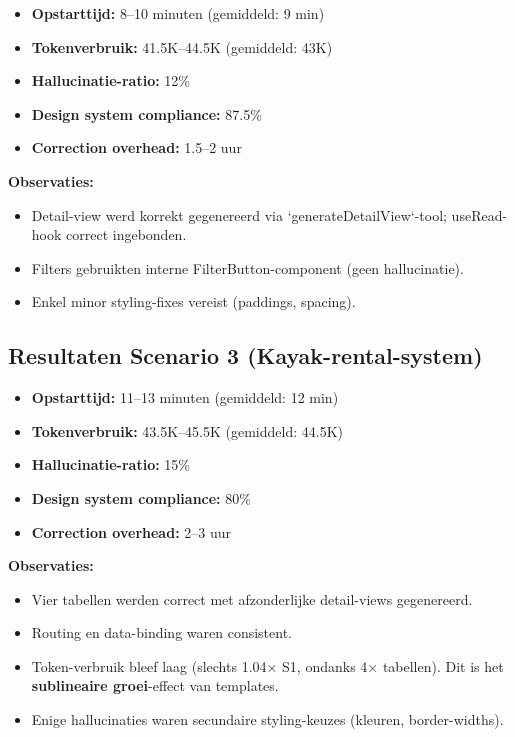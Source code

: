 \begin{itemize}
  \item \textbf{Opstarttijd:} 8--10 minuten (gemiddeld: 9 min)
  \item \textbf{Tokenverbruik:} 41.5K--44.5K (gemiddeld: 43K)
  \item \textbf{Hallucinatie-ratio:} 12\%
  \item \textbf{Design system compliance:} 87.5\%
  \item \textbf{Correction overhead:} 1.5--2 uur
\end{itemize}

\noindent
\textbf{Observaties:}
\begin{itemize}
  \item Detail-view werd korrekt gegenereerd via `generateDetailView`-tool; useRead-hook correct ingebonden.
  \item Filters gebruikten interne FilterButton-component (geen hallucinatie).
  \item Enkel minor styling-fixes vereist (paddings, spacing).
\end{itemize}

\subsection{Resultaten Scenario 3 (Kayak-rental-system)}

\begin{itemize}
  \item \textbf{Opstarttijd:} 11--13 minuten (gemiddeld: 12 min)
  \item \textbf{Tokenverbruik:} 43.5K--45.5K (gemiddeld: 44.5K)
  \item \textbf{Hallucinatie-ratio:} 15\%
  \item \textbf{Design system compliance:} 80\%
  \item \textbf{Correction overhead:} 2--3 uur
\end{itemize}

\noindent
\textbf{Observaties:}
\begin{itemize}
  \item Vier tabellen werden correct met afzonderlijke detail-views gegenereerd.
  \item Routing en data-binding waren consistent.
  \item Token-verbruik bleef laag (slechts 1.04× S1, ondanks 4× tabellen). Dit is het \textbf{sublineaire groei}-effect van templates.
  \item Enige hallucinaties waren secundaire styling-keuzes (kleuren, border-widths).
\end{itemize}

